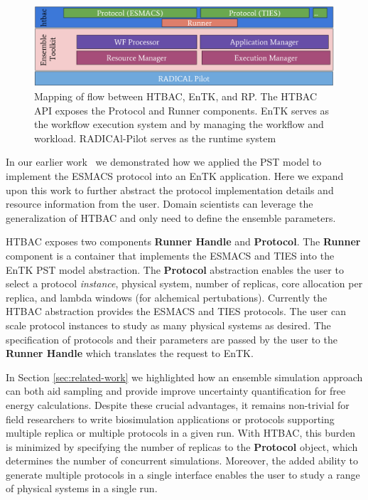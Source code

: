 \begin{figure}
  \centering
   \includegraphics[width=\columnwidth]{figures/isc_htbac_integration_with_entk_RP.pdf}
  \caption{Mapping of flow between HTBAC, EnTK, and RP. The HTBAC API exposes the Protocol
  and Runner components. EnTK serves as the workflow execution system and
  by managing the workflow and workload. RADICAl-Pilot serves as the runtime system}
\label{fig:integration}
\end{figure}

	In our earlier work~\cite{dakka2017} we demonstrated how we applied the PST model to
implement the ESMACS protocol into an EnTK application. Here we expand upon this
work to further abstract the protocol implementation details and resource
information from the user. Domain scientists can leverage the generalization
of HTBAC and only need to define the ensemble parameters.

	HTBAC exposes two components \textbf{Runner Handle} and \textbf{Protocol}.
The \textbf{Runner} component is a container that implements the ESMACS 
and TIES into the EnTK PST model abstraction. The \textbf{Protocol} 
abstraction enables the user to select a protocol \textit{instance}, physical
system, number of replicas, core allocation per replica, and lambda 
windows (for alchemical pertubations). Currently the HTBAC abstraction provides
the ESMACS and TIES protocols. The user can scale protocol instances to study as
many physical systems as desired. The specification of protocols and 
their parameters are passed by the user to the \textbf{Runner Handle} which 
translates the request to EnTK. 

	In Section \ref{sec:related-work} we highlighted how an ensemble simulation 
approach can both aid sampling and provide improve uncertainty quantification 
for free energy calculations. Despite these crucial advantages, 
it remains non-trivial for field 
researchers to write biosimulation applications or protocols supporting 
multiple replica or multiple protocols in a given run. With HTBAC, this 
burden is minimized by specifying the number of replicas to the 
\textbf{Protocol} object, which determines the number of concurrent simulations. 
Moreover, the added ability to generate multiple protocols in a single interface 
enables the user to study a range of physical systems in a single run. 

